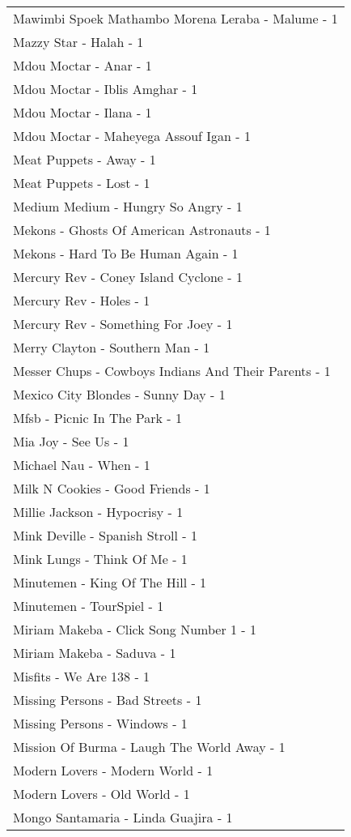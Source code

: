 \documentclass[
]{article}
\begin{document}
\begin{longtable}{l}
Mawimbi Spoek Mathambo Morena Leraba - Malume - 1 \\ 
Mazzy Star - Halah - 1 \\ 
Mdou Moctar - Anar - 1 \\ 
Mdou Moctar - Iblis Amghar - 1 \\ 
Mdou Moctar - Ilana - 1 \\ 
Mdou Moctar - Maheyega Assouf Igan - 1 \\ 
Meat Puppets - Away - 1 \\ 
Meat Puppets - Lost - 1 \\ 
Medium Medium - Hungry So Angry - 1 \\ 
Mekons - Ghosts Of American Astronauts - 1 \\ 
Mekons - Hard To Be Human Again - 1 \\ 
Mercury Rev - Coney Island Cyclone - 1 \\ 
Mercury Rev - Holes - 1 \\ 
Mercury Rev - Something For Joey - 1 \\ 
Merry Clayton - Southern Man - 1 \\ 
Messer Chups - Cowboys Indians And Their Parents - 1 \\ 
Mexico City Blondes - Sunny Day - 1 \\ 
Mfsb - Picnic In The Park - 1 \\ 
Mia Joy - See Us - 1 \\ 
Michael Nau - When - 1 \\ 
Milk N Cookies - Good Friends - 1 \\ 
Millie Jackson - Hypocrisy - 1 \\ 
Mink Deville - Spanish Stroll - 1 \\ 
Mink Lungs - Think Of Me - 1 \\ 
Minutemen - King Of The Hill - 1 \\ 
Minutemen - TourSpiel - 1 \\ 
Miriam Makeba - Click Song Number 1 - 1 \\ 
Miriam Makeba - Saduva - 1 \\ 
Misfits - We Are 138 - 1 \\ 
Missing Persons - Bad Streets - 1 \\ 
Missing Persons - Windows - 1 \\ 
Mission Of Burma - Laugh The World Away - 1 \\ 
Modern Lovers - Modern World - 1 \\ 
Modern Lovers - Old World - 1 \\ 
Mongo Santamaria - Linda Guajira - 1 \\ 

\end{longtable}
\end{document}

